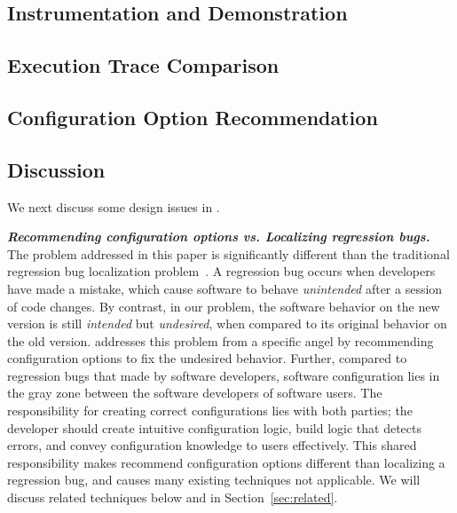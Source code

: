 \subsection{Instrumentation and Demonstration}
\label{sec:profiling}



\subsection{Execution Trace Comparison}
\label{sec:comparison}



\subsection{Configuration Option Recommendation}
\label{sec:rootcause}



\subsection{Discussion}

We next discuss some design issues in \ourtool.

\vspace{1mm}

\noindent \textbf{\textit{Recommending configuration options
vs. Localizing regression bugs.}}
The problem addressed in this paper is significantly different
than the traditional regression bug localization problem~\cite{}.
A regression bug occurs when developers have made a mistake,
which cause software to behave \textit{unintended} after a session of code changes.
By contrast, in our problem, the software behavior on the new version
is still \textit{intended} but \textit{undesired}, when compared
to its original behavior on the old version. \ourtool addresses
this problem from a specific angel by recommending configuration options
to fix the undesired behavior. Further, compared to
regression bugs that made by software developers,
software configuration lies in the gray zone between
the software developers of software users. The responsibility for creating
correct configurations lies with both parties; the developer should create
intuitive configuration logic, build logic that detects
errors, and convey configuration knowledge to users
effectively. This shared responsibility makes recommend configuration options
different than localizing a regression bug, and causes many existing
techniques not applicable. We will discuss related techniques below
and in Section~\ref{sec:related}.


